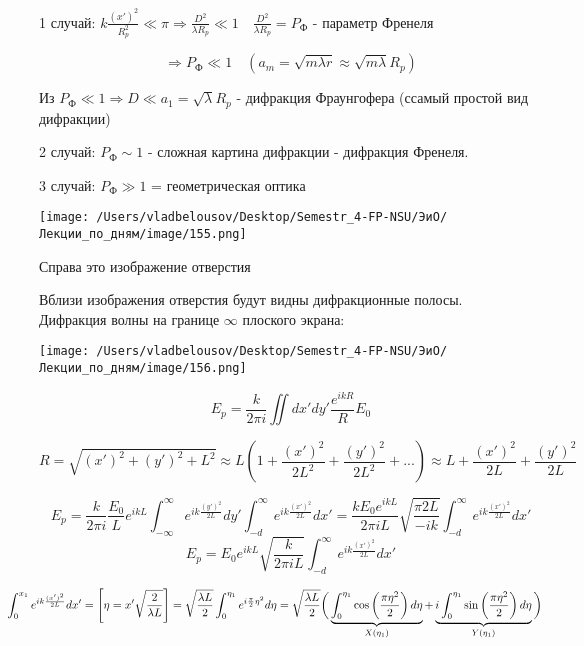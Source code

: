 \documentclass[12pt, a4paper]{report}
\begin{document}
1 случай: \( \displaystyle  k \frac{ ( x ' ) ^2 }{R_p ^2 } \ll \pi \Rightarrow \frac{ D ^2 }{ \lambda R_p } \ll 1 \quad  \frac{ D ^2 }{\lambda R_p } = P_{\text{Ф} } \text{ - параметр Френеля}      \) 

\[ \Rightarrow P_{\text{Ф} }  \ll 1 \quad  (a_m = \sqrt{m \lambda r } \approx \sqrt{m \lambda }R_p)   \] 

Из \( P_{\text{Ф} } \ll 1 \Rightarrow D \ll a_1 = \sqrt{\lambda}R_p  \) - дифракция Фраунгофера (ссамый простой вид дифракции)

2 случай: \( P_{\text{Ф} } \sim 1  \) - сложная картина дифракции - дифракция Френеля. 

3 случай: \( P_{\text{Ф} } \gg 1   \) = геометрическая оптика 

\begin{center}
    \texttt{[image: /Users/vladbelousov/Desktop/Semestr\_4-FP-NSU/ЭиО/Лекции\_по\_дням/image/155.png]}
\end{center}
Справа это изображение отверстия 

Вблизи изображения отверстия будут видны дифракционные полосы. \\

Дифракция волны на границе \( \infty  \) плоского экрана: 

\begin{center}
    \texttt{[image: /Users/vladbelousov/Desktop/Semestr\_4-FP-NSU/ЭиО/Лекции\_по\_дням/image/156.png]}
\end{center}

\[ E_p = \frac{k}{ 2 \pi i } \iint  d x ' d y ' \frac{e^{ i kR } }{R } E_0 \] 

\[R = \sqrt{( x ') ^2 + (y ' ) ^2 + L ^2 } \approx L \left( 1 + \frac{ (x ' ) ^2 }{2 L ^2 } + \frac{ (y ' ) ^2 }{2 L ^2 } + ...   \right)  \approx L + \frac{( x ' ) ^2 }{2 L } + \frac{ (y ' ) ^2 }{2 L }   \] 

\[ E_p = \frac{k }{2 \pi i } \frac{E_0 }{L } e^{ik L } \int_{-\infty}^{\infty} e^{ ik \frac{( y ' ) ^2 }{2 L } } d y ' \int_{-d }^{\infty}  e^{ik \frac{( x' ) ^2 }{2L } } dx ' = \frac{k E_0 e^{ i k L } }{2 \pi i L } \sqrt{\frac{\pi 2L }{- i k } } \int_{-d }^{\infty}  e^{ i k \frac{(x ' ) ^2 }{2 L } } dx '     \] 
\[ E_p = E_0 e^{ i k L } \sqrt{\frac{k}{ 2 \pi i L }  } \int_{-d }^{\infty} e^{ i k \frac{(x ' ) ^2 }{2 L } } dx '  \] 

\[\kern-1cm \int_{0 }^{x_1 } e^{ i k \frac{(x ' ) ^2 }{2 L } } dx '  = \left[ \eta  = x' \sqrt{\frac{2}{\lambda L}  } \right] = \sqrt{\frac{\lambda L }{2} }\int_{0 }^{\eta_1} e^{ i \frac{\pi}{2 }  \eta ^2 } d \eta  = \sqrt{\frac{\lambda L }{2} } \bigg(\underbrace{  \int_{ 0 }^{\eta_1 } \cos \left( \frac{\pi \eta ^2 }{2 }  \right) d \eta}_{X(\eta_1 )} + \underbrace{i \int_{0}^{\eta_1 } \sin \left( \frac{\pi \eta ^2 }{2 }  \right) d \eta  }_{Y(\eta_1)} \bigg)   \] 
\end{document}
